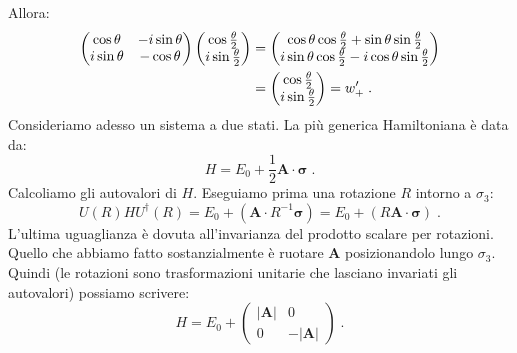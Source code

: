 \documentclass[12pt,a4paper]{report}
\theoremstyle{definition}
\numberwithin{equation}{section}
\newcommand{\adj}[1]{#1^{\dagger}}
\begin{document}
Allora:
\begin{align}
\left(\begin{matrix}
\cos\theta & -i\sin\theta \\
i\sin\theta & -\cos\theta
\end{matrix}\right)\left(\begin{matrix}
\cos\frac{\theta}{2} \\
i\sin\frac{\theta}{2}
\end{matrix}\right) &= \left(
\begin{matrix}
\cos\theta\cos\frac{\theta}{2}+\sin\theta\sin\frac{\theta}{2} \\
i\sin\theta\cos\frac{\theta}{2}-i\cos\theta\sin\frac{\theta}{2}
\end{matrix}\right) \notag \\
&= \left(\begin{matrix}
\cos\frac{\theta}{2} \\
i\sin\frac{\theta}{2}
\end{matrix}\right)=w_+'\;.
\end{align}
Consideriamo adesso un sistema a due stati. La più generica Hamiltoniana è data da:
\begin{equation}
H=E_0+\frac{1}{2}\mathbf{A}\cdot\boldsymbol{\sigma}\;.
\end{equation}
Calcoliamo gli autovalori di $H$. Eseguiamo prima una rotazione $R$ intorno a $\sigma_3$:
\begin{equation}
U(R)H\adj{U}(R)=E_0+(\mathbf{A}\cdot R^{-1}\boldsymbol{\sigma})=E_0+(R\mathbf{A}\cdot\boldsymbol{\sigma})\;.
\end{equation}
L'ultima uguaglianza è dovuta all'invarianza del prodotto scalare per rotazioni. Quello che abbiamo fatto sostanzialmente è ruotare $\mathbf{A}$ posizionandolo lungo $\sigma_3$. Quindi (le rotazioni sono trasformazioni unitarie che lasciano invariati gli autovalori) possiamo scrivere:
\begin{equation}
H=E_0+\left(\begin{matrix}
|\mathbf{A}| & 0 \\
0 & -|\mathbf{A}|
\end{matrix}\right)\;.
\end{equation}
\end{document}
